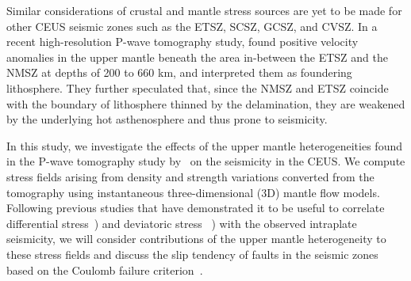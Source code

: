 \documentclass[draft,linenumbers]{agujournal2018}
\begin{document}
Similar considerations of crustal and mantle stress sources are yet to be made for other CEUS seismic zones such as the ETSZ, SCSZ, GCSZ, and CVSZ. In a recent high-resolution P-wave tomography study, \citet{Biryol_2016} found positive velocity anomalies in the upper mantle beneath the area in-between the ETSZ and the NMSZ at depths of 200 to 660 km, and interpreted them as foundering lithosphere. They further speculated that, since the NMSZ and ETSZ coincide with the boundary of lithosphere thinned by the delamination, they are weakened by the underlying hot asthenosphere and thus prone to seismicity. 

In this study, we investigate the effects of the upper mantle heterogeneities found in the P-wave tomography study by~\citet{Biryol_2016} on the seismicity in the CEUS. We compute stress fields arising from density and strength variations converted from the tomography using instantaneous three-dimensional (3D) mantle flow models. %
Following previous studies that have demonstrated it to be useful to correlate differential stress~\citep[e.g.,][]{baird2010relationship, zhan2016stress}) and deviatoric stress ~\citep[e.g.,][]{levandowski2016dense}) with the observed intraplate seismicity, 
we will consider contributions of the upper mantle heterogeneity to these stress fields and discuss the slip tendency of faults in the seismic zones based on the Coulomb failure criterion~\citep[e.g.,][]{king1994static, freed2005earthquake, li2007stress}. 
\end{document}
